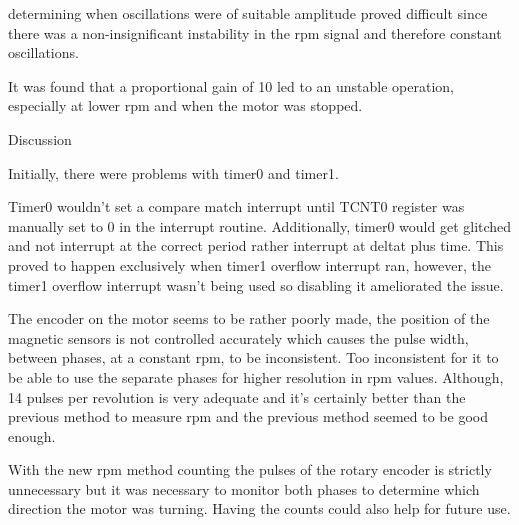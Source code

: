 determining when oscillations were of suitable amplitude proved difficult since there was a non-insignificant instability in the rpm signal and therefore constant oscillations. 

It was found that a proportional gain of 10 led to an unstable operation, especially at lower rpm and when the motor was stopped. 


Discussion

Initially, there were problems with timer0 and timer1. 

Timer0 wouldn't set a compare match interrupt until TCNT0 register was manually set to 0 in the interrupt routine. Additionally, timer0 would get glitched and not interrupt at the correct period rather interrupt at deltat plus time. This proved to happen exclusively when timer1 overflow interrupt ran, however, the timer1 overflow interrupt wasn't being used so disabling it ameliorated the issue.

The encoder on the motor seems to be rather poorly made, the position of the magnetic sensors is not controlled accurately which causes the pulse width, between phases, at a constant rpm, to be inconsistent. Too inconsistent for it to be able to use the separate phases for higher resolution in rpm values. Although, 14 pulses per revolution is very adequate and it's certainly better than the previous method to measure rpm and the previous method seemed to be good enough. 

With the new rpm method counting the pulses of the rotary encoder is strictly unnecessary but it was necessary to monitor both phases to determine which direction the motor was turning. Having the counts could also help for future use. 